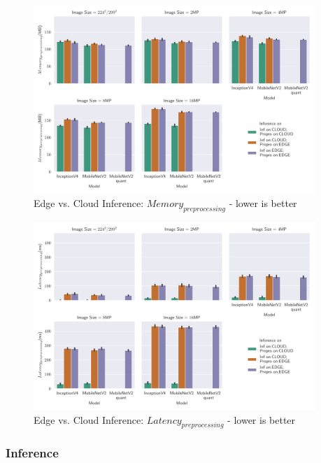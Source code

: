 \begin{figure}[!htb]
\centering
\includegraphics[width=0.95\textwidth]{./Bilder/single_plots/edge_vs_cloud_plots/Edge_vs_Cloud_Inference_Preprocessing_Memory.pdf}
\caption{Edge vs. Cloud Inference:  $Memory_{preprocessing}$ - lower is better}
\label{fig:EdgeVsCloudPreproMemory}
\end{figure}

\begin{figure}[!htb]
\centering
\includegraphics[width=0.95\textwidth]{./Bilder/single_plots/edge_vs_cloud_plots/Edge_vs_Cloud_Inference_Preprocessing_Latencies.pdf}
\caption{Edge vs. Cloud Inference:  $Latency_{preprocessing}$ - lower is better}
\label{fig:EdgeVsCloudPreproLat}
\end{figure}

\FloatBarrier
\subsubsection{Inference}
